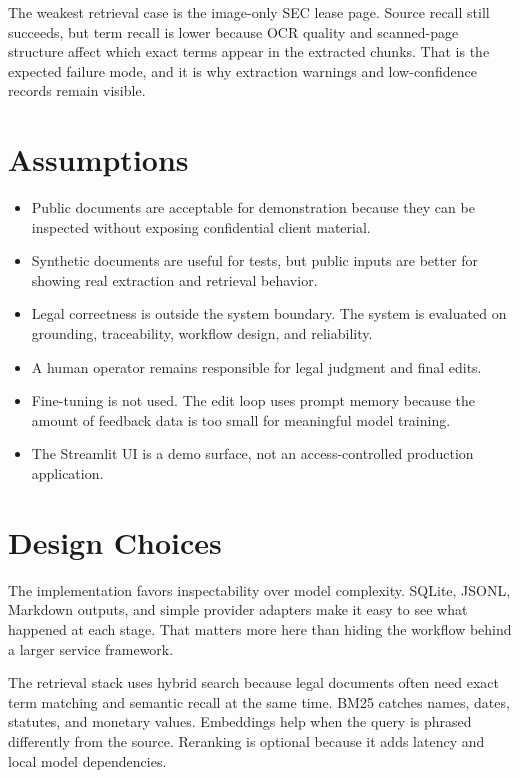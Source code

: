 \documentclass[11pt]{article}
\begin{document}
The weakest retrieval case is the image-only SEC lease page. Source recall still succeeds, but term recall is lower because OCR quality and scanned-page structure affect which exact terms appear in the extracted chunks. That is the expected failure mode, and it is why extraction warnings and low-confidence records remain visible.

\section{Assumptions}

\begin{itemize}
  \item Public documents are acceptable for demonstration because they can be inspected without exposing confidential client material.
  \item Synthetic documents are useful for tests, but public inputs are better for showing real extraction and retrieval behavior.
  \item Legal correctness is outside the system boundary. The system is evaluated on grounding, traceability, workflow design, and reliability.
  \item A human operator remains responsible for legal judgment and final edits.
  \item Fine-tuning is not used. The edit loop uses prompt memory because the amount of feedback data is too small for meaningful model training.
  \item The Streamlit UI is a demo surface, not an access-controlled production application.
\end{itemize}

\section{Design Choices}

The implementation favors inspectability over model complexity. SQLite, JSONL, Markdown outputs, and simple provider adapters make it easy to see what happened at each stage. That matters more here than hiding the workflow behind a larger service framework.

The retrieval stack uses hybrid search because legal documents often need exact term matching and semantic recall at the same time. BM25 catches names, dates, statutes, and monetary values. Embeddings help when the query is phrased differently from the source. Reranking is optional because it adds latency and local model dependencies.
\end{document}
